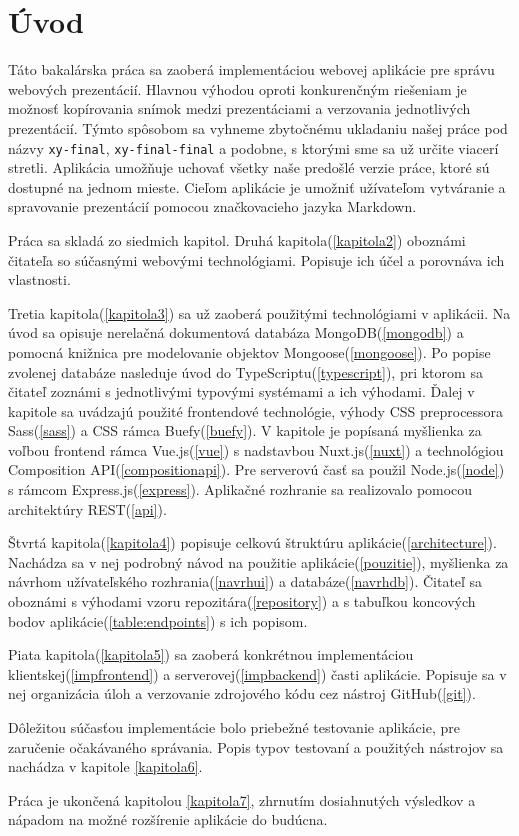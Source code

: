 \chapter{Úvod}
Táto bakalárska práca sa zaoberá implementáciou webovej aplikácie pre správu webových prezentácií. Hlavnou výhodou oproti konkurenčným riešeniam je možnosť kopírovania snímok medzi prezentáciami a verzovania jednotlivých prezentácií. Týmto spôsobom sa vyhneme zbytočnému ukladaniu našej práce pod názvy \texttt{xy-final}, \texttt{xy-final-final} a podobne, s ktorými sme sa už určite viacerí stretli. Aplikácia umožňuje uchovať všetky naše predošlé verzie práce, ktoré sú dostupné na jednom mieste. Cieľom aplikácie je umožniť užívateľom vytváranie a spravovanie prezentácií pomocou značkovacieho jazyka Markdown.

Práca sa skladá zo siedmich kapitol. Druhá kapitola(\ref{kapitola2}) oboznámi čitateľa so súčasnými webovými technológiami. Popisuje ich účel a porovnáva ich vlastnosti. 

Tretia kapitola(\ref{kapitola3}) sa už zaoberá použitými technológiami v aplikácii. Na úvod sa opisuje nerelačná dokumentová databáza MongoDB(\ref{mongodb}) a pomocná knižnica pre modelovanie objektov Mongoose(\ref{mongoose}). Po popise zvolenej databáze nasleduje úvod do TypeScriptu(\ref{typescript}), pri ktorom sa čitateľ zoznámi s jednotlivými typovými systémami a ich výhodami. Ďalej v kapitole sa uvádzajú použité frontendové technológie, výhody CSS preprocessora Sass(\ref{sass}) a CSS rámca Buefy(\ref{buefy}). V kapitole je popísaná myšlienka za voľbou frontend rámca Vue.js(\ref{vue}) s nadstavbou Nuxt.js(\ref{nuxt}) a technológiou Composition API(\ref{compositionapi}). Pre serverovú časť sa použil Node.js(\ref{node}) s rámcom Express.js(\ref{express}). Aplikačné rozhranie sa realizovalo pomocou architektúry REST(\ref{api}).

Štvrtá kapitola(\ref{kapitola4}) popisuje celkovú štruktúru aplikácie(\ref{architecture}). Nachádza sa v nej podrobný návod na použitie aplikácie(\ref{pouzitie}), myšlienka za návrhom užívateľského rozhrania(\ref{navrhui}) a databáze(\ref{navrhdb}). Čitateľ sa oboznámi s výhodami vzoru repozitára(\ref{repository}) a s tabuľkou koncových bodov aplikácie(\ref{table:endpoints}) s ich popisom.

Piata kapitola(\ref{kapitola5}) sa zaoberá konkrétnou implementáciou klientskej(\ref{impfrontend}) a serverovej(\ref{impbackend}) časti aplikácie. Popisuje sa v nej organizácia úloh a verzovanie zdrojového kódu cez nástroj GitHub(\ref{git}).

Dôležitou súčasťou implementácie bolo priebežné testovanie aplikácie, pre zaručenie očakávaného správania. Popis typov testovaní a použitých nástrojov sa nachádza v kapitole \ref{kapitola6}.

Práca je ukončená kapitolou \ref{kapitola7}, zhrnutím dosiahnutých výsledkov a nápadom na možné rozšírenie aplikácie do budúcna. 